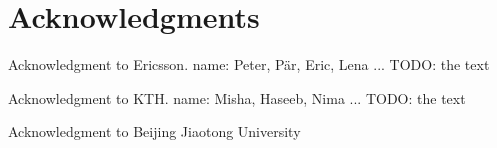 \chapter*{Acknowledgments}

Acknowledgment to Ericsson. name: Peter, P\"{a}r, Eric, Lena ... TODO: the text

Acknowledgment to KTH. name: Misha, Haseeb, Nima ... TODO: the text

Acknowledgment to Beijing Jiaotong University





